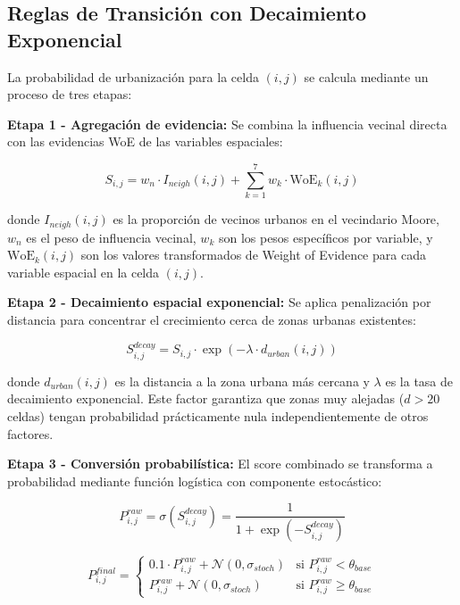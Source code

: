 \subsection{Reglas de Transición con Decaimiento Exponencial}

La probabilidad de urbanización para la celda $(i,j)$ se calcula mediante un proceso de tres etapas:

\textbf{Etapa 1 - Agregación de evidencia:} Se combina la influencia vecinal directa con las evidencias WoE de las variables espaciales:

\begin{equation}
S_{i,j} = w_n \cdot I_{neigh}(i,j) + \sum_{k=1}^{7} w_k \cdot \text{WoE}_k(i,j)
\label{eq:evidence_aggregation}
\end{equation}

donde $I_{neigh}(i,j)$ es la proporción de vecinos urbanos en el vecindario Moore, $w_n$ es el peso de influencia vecinal, $w_k$ son los pesos específicos por variable, y $\text{WoE}_k(i,j)$ son los valores transformados de Weight of Evidence para cada variable espacial en la celda $(i,j)$.

\textbf{Etapa 2 - Decaimiento espacial exponencial:} Se aplica penalización por distancia para concentrar el crecimiento cerca de zonas urbanas existentes:

\begin{equation}
S_{i,j}^{decay} = S_{i,j} \cdot \exp\left(-\lambda \cdot d_{urban}(i,j)\right)
\label{eq:exponential_decay}
\end{equation}

donde $d_{urban}(i,j)$ es la distancia a la zona urbana más cercana y $\lambda$ es la tasa de decaimiento exponencial. Este factor garantiza que zonas muy alejadas ($d > 20$ celdas) tengan probabilidad prácticamente nula independientemente de otros factores.

\textbf{Etapa 3 - Conversión probabilística:} El score combinado se transforma a probabilidad mediante función logística con componente estocástico:

\begin{equation}
P_{i,j}^{raw} = \sigma(S_{i,j}^{decay}) = \frac{1}{1 + \exp(-S_{i,j}^{decay})}
\label{eq:logistic_transform}
\end{equation}

\begin{equation}
P_{i,j}^{final} = \begin{cases}
0.1 \cdot P_{i,j}^{raw} + \mathcal{N}(0, \sigma_{stoch}) & \text{si } P_{i,j}^{raw} < \theta_{base} \\
P_{i,j}^{raw} + \mathcal{N}(0, \sigma_{stoch}) & \text{si } P_{i,j}^{raw} \geq \theta_{base}
\end{cases}
\label{eq:final_probability}
\end{equation}

